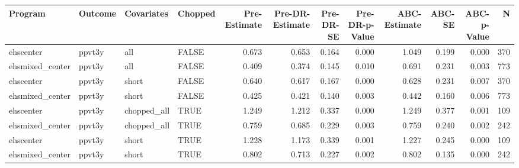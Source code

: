 \begin{table}[ht]
\centering
\begin{tabular}{llllrrrrrrrr}
  \hline
Program & Outcome & Covariates & Chopped & Pre-Estimate & Pre-DR-Estimate & Pre-DR-SE & Pre-DR-p-Value & ABC-Estimate & ABC-SE & ABC-p-Value & N \\ 
  \hline
ehscenter & ppvt3y & all & FALSE & 0.673 & 0.653 & 0.164 & 0.000 & 1.049 & 0.199 & 0.000 & 370 \\ 
  ehsmixed\_center & ppvt3y & all & FALSE & 0.409 & 0.374 & 0.145 & 0.010 & 0.691 & 0.231 & 0.003 & 773 \\ 
  ehscenter & ppvt3y & short & FALSE & 0.640 & 0.617 & 0.167 & 0.000 & 0.628 & 0.231 & 0.007 & 370 \\ 
  ehsmixed\_center & ppvt3y & short & FALSE & 0.425 & 0.421 & 0.140 & 0.003 & 0.442 & 0.160 & 0.006 & 773 \\ 
  ehscenter & ppvt3y & chopped\_all & TRUE & 1.249 & 1.212 & 0.337 & 0.000 & 1.249 & 0.377 & 0.001 & 109 \\ 
  ehsmixed\_center & ppvt3y & chopped\_all & TRUE & 0.759 & 0.685 & 0.229 & 0.003 & 0.759 & 0.240 & 0.002 & 242 \\ 
  ehscenter & ppvt3y & short & TRUE & 1.228 & 1.173 & 0.339 & 0.001 & 1.227 & 0.245 & 0.000 & 109 \\ 
  ehsmixed\_center & ppvt3y & short & TRUE & 0.802 & 0.713 & 0.227 & 0.002 & 0.802 & 0.135 & 0.000 & 242 \\ 
   \hline
\end{tabular}
\end{table}
